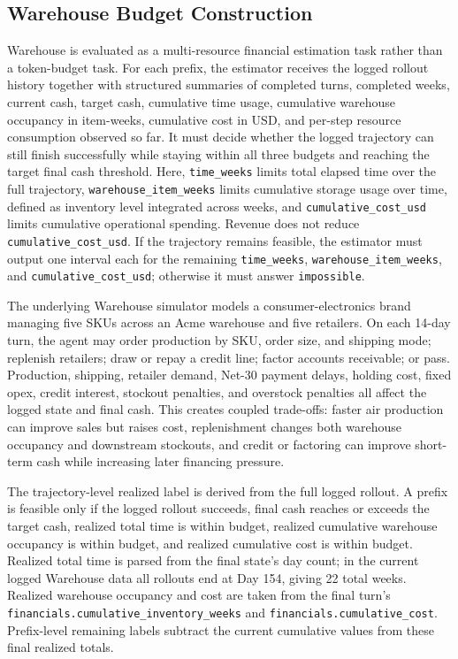 \subsection{Warehouse Budget Construction}
\label{sec:warehouse-budget-construction}

Warehouse is evaluated as a multi-resource financial estimation task rather than a token-budget task. For each prefix, the estimator receives the logged rollout history together with structured summaries of completed turns, completed weeks, current cash, target cash, cumulative time usage, cumulative warehouse occupancy in item-weeks, cumulative cost in USD, and per-step resource consumption observed so far. It must decide whether the logged trajectory can still finish successfully while staying within all three budgets and reaching the target final cash threshold. Here, \texttt{time\_weeks} limits total elapsed time over the full trajectory, \texttt{warehouse\_item\_weeks} limits cumulative storage usage over time, defined as inventory level integrated across weeks, and \texttt{cumulative\_cost\_usd} limits cumulative operational spending. Revenue does not reduce \texttt{cumulative\_cost\_usd}. If the trajectory remains feasible, the estimator must output one interval each for the remaining \texttt{time\_weeks}, \texttt{warehouse\_item\_weeks}, and \texttt{cumulative\_cost\_usd}; otherwise it must answer \texttt{impossible}.

The underlying Warehouse simulator models a consumer-electronics brand managing five SKUs across an Acme warehouse and five retailers. On each 14-day turn, the agent may order production by SKU, order size, and shipping mode; replenish retailers; draw or repay a credit line; factor accounts receivable; or pass. Production, shipping, retailer demand, Net-30 payment delays, holding cost, fixed opex, credit interest, stockout penalties, and overstock penalties all affect the logged state and final cash. This creates coupled trade-offs: faster air production can improve sales but raises cost, replenishment changes both warehouse occupancy and downstream stockouts, and credit or factoring can improve short-term cash while increasing later financing pressure.

The trajectory-level realized label is derived from the full logged rollout. A prefix is feasible only if the logged rollout succeeds, final cash reaches or exceeds the target cash, realized total time is within budget, realized cumulative warehouse occupancy is within budget, and realized cumulative cost is within budget. Realized total time is parsed from the final state's day count; in the current logged Warehouse data all rollouts end at Day 154, giving 22 total weeks. Realized warehouse occupancy and cost are taken from the final turn's \texttt{financials.cumulative\_inventory\_weeks} and \texttt{financials.cumulative\_cost}. Prefix-level remaining labels subtract the current cumulative values from these final realized totals.


